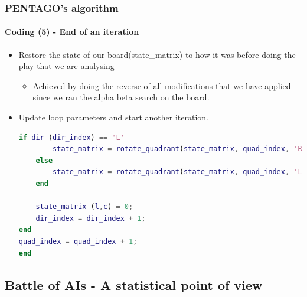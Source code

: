 \documentclass[10pt]{beamer}
\begin{document}
\begin{frame}[fragile]

\frametitle{PENTAGO's algorithm}
\framesubtitle{Coding (5) - End of an iteration}

\begin{itemize}
  	\item Restore the state of our board(state\_matrix) to how it was before
  	doing the play that we are analysing
	
	\begin{itemize}
	  
		\item Achieved by doing the reverse of all modifications that we have applied
		since we ran the alpha beta search on the board.

	\end{itemize}
	
	\item Update loop parameters and start another iteration.\\

\begin{lstlisting}[language=Matlab]
	if dir (dir_index) == 'L'
		state_matrix = rotate_quadrant(state_matrix, quad_index, 'R');
	else
		state_matrix = rotate_quadrant(state_matrix, quad_index, 'L');
	end

	state_matrix (l,c) = 0;
	dir_index = dir_index + 1;
end
quad_index = quad_index + 1;
end
\end{lstlisting}
\end{itemize}

\end{frame}

\subsection{Battle of AIs - A statistical point of view}
\end{document}

